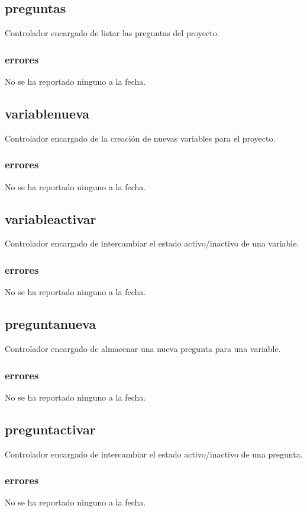 \documentclass[10pt,a4paper]{book}
\begin{document}
	\subsection{preguntas}
	Controlador encargado de listar las preguntas del proyecto.
	\subsubsection{errores}
	No se ha reportado ninguno a la fecha.
	
	\subsection{variablenueva}
	Controlador encargado de la creación de nuevas variables para el proyecto.
	\subsubsection{errores}
	No se ha reportado ninguno a la fecha.
	
	\subsection{variableactivar}
	Controlador encargado de intercambiar el estado activo/inactivo de una variable.
	\subsubsection{errores}
	No se ha reportado ninguno a la fecha.
	
	\subsection{preguntanueva}
	Controlador encargado de almacenar una nueva pregunta para una variable.
	\subsubsection{errores}
	No se ha reportado ninguno a la fecha.
	
	\subsection{preguntactivar}
	Controlador encargado de intercambiar el estado activo/inactivo de una pregunta.
	\subsubsection{errores}
	No se ha reportado ninguno a la fecha.
	
\end{document}

